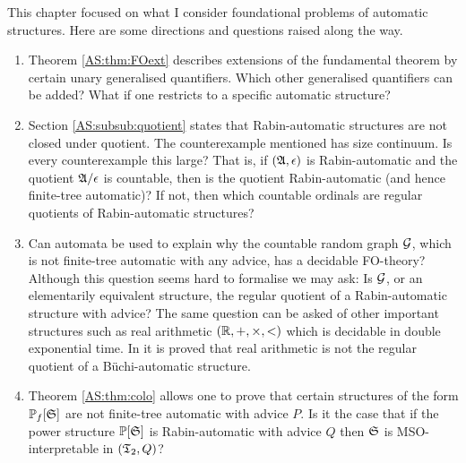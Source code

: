 This chapter focused on what I consider foundational problems of automatic structures. 
Here are some directions and questions raised along the way.
\begin{enumerate}
\item Theorem \ref{AS:thm:FOext} describes extensions of the fundamental theorem by certain unary generalised quantifiers. Which other generalised quantifiers can be added? What if one restricts to a specific automatic structure? 
\item Section \ref{AS:subsub:quotient} states that Rabin-automatic structures are not closed under quotient. The counterexample mentioned has size continuum. Is every counterexample this large? That is, if $(\mathfrak{A},\epsilon)$ is Rabin-automatic and the quotient $\mathfrak{A}/\epsilon$ is countable, then is the quotient Rabin-automatic (and hence finite-tree automatic)? If not, then which countable ordinals are regular quotients of Rabin-automatic structures?
\item Can automata be used to explain why the countable random graph ${\mathcal G}$, which is not finite-tree automatic with any advice,  has a decidable FO-theory? Although this question seems hard to formalise we may ask: Is ${\mathcal G}$, or an elementarily equivalent structure, the regular quotient of a Rabin-automatic structure with advice? The same question can be asked of other important structures such as real arithmetic $(\mathbb{R},+,\times,<)$ which is decidable in double exponential time. In \cite{AGKW13} it is proved that real arithmetic is not the regular quotient of a B\"uchi-automatic structure.
\item Theorem \ref{AS:thm:colo} allows one to prove that certain structures of the form ${\mathbb P}_f[\mathfrak{S}]$ are not finite-tree automatic with advice $P$. Is it the case that if the power structure ${\mathbb P}[\mathfrak{S}]$ is Rabin-automatic with advice $Q$ then $\mathfrak{S}$ is
MSO-interpretable in $(\mathfrak{T}_2,Q)$? 
\end{enumerate}


